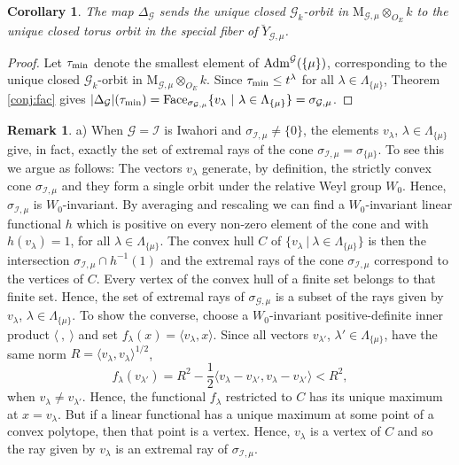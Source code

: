 \documentclass[reqno, 10pt]{amsart}
\newcommand{\CG}{\ensuremath{\mathcal {G}}\xspace}
\newcommand{\CI}{\ensuremath{\mathcal {I}}\xspace}
\newcommand{\RM}{\ensuremath{\mathrm {M}}\xspace}
\newtheorem{corollary}[subsubsection]{Corollary}
\theoremstyle{definition}
\newtheorem{remark}[subsubsection]{Remark}
\numberwithin{equation}{subsection}
\numberwithin{subsubsection}{subsection}
\newcommand{\br}{\breve}
\begin{document}
\begin{corollary}\label{cor:oldC}
The map $\Delta_\CG$ sends the unique closed $\CG_k$-orbit in $\RM_{\CG,\mu}\otimes_{O_E}k$ to the unique closed torus orbit in the special fiber of $\br Y_{\CG,\mu}$.
\end{corollary}
\begin{proof}
Let $\tau_{\rm min}$ denote the smallest element of ${\rm Adm}^\CG(\{\mu\})$, corresponding to the unique closed $\CG_k$-orbit in $\RM_{\CG,\mu}\otimes_{O_E}k$. Since $\tau_{\rm min}\leq t^\lambda$ for all $\lambda\in\Lambda_{\{\mu\}}$, Theorem \ref{conj:fac} gives 
$|\Delta_\CG|(\tau_{\rm min})={\rm Face}_{\sigma_{\CG,\mu}}\{v_\lambda\ |\ \lambda\in\Lambda_{\{\mu\}}\}=\sigma_{\CG,\mu}$.
\end{proof}
 
\begin{remark}\label{rem:oldBandC}
a) When $\CG=\CI$ is Iwahori and $\sigma_{\CI,\mu}\neq \{0\}$, the  elements $v_\lambda$, $\lambda\in \Lambda_{\{\mu\}}$  give, in fact, exactly the set of extremal rays of the cone $\sigma_{\CI,\mu}=\sigma_{\{\mu\}}$.  To see this we  argue as follows: The vectors $v_\lambda$ generate, by definition, the strictly convex cone $\sigma_{\CI, \mu}$ 
 and they form a single orbit under the relative Weyl group $W_0$. Hence, $\sigma_{\CI, \mu}$ is $W_0$-invariant. 
 By averaging and rescaling we can find a  $W_0$-invariant linear functional $h$ which is positive on every non-zero element of the cone and with $h(v_\lambda)=1$, for all $\lambda\in \Lambda_{\{\mu\}}$. The convex hull $C$ of $\{v_\lambda\ |\ \lambda\in \Lambda_{\{\mu\}}\}$  is then the intersection $\sigma_{\CI,\mu}\cap h^{-1}(1)$
 and the extremal rays of the cone $\sigma_{\CI,\mu}$ correspond to the vertices of $C$. Every vertex of  the convex hull of a finite set belongs to that finite set. Hence, the set of extremal rays of $\sigma_{\CG,\mu}$ is a subset of the rays given by $v_\lambda$, $\lambda\in \Lambda_{\{\mu\}}$. To show the converse,  choose a $W_0$-invariant positive-definite inner product $\langle\ ,\ \rangle$ and set 
 $f_\lambda(x)=\langle v_\lambda, x \rangle$. Since all vectors $v_{\lambda'}$, $\lambda'\in \Lambda_{\{\mu\}}$, have the same norm $R=\langle v_\lambda ,v_\lambda \rangle^{1/2}$, 
 \[
f_\lambda(v_{\lambda'})=R^2-\frac{1}{2}\langle v_\lambda- v_{\lambda'} , v_\lambda- v_{\lambda'} \rangle<R^2,
 \]
 when $v_\lambda\neq v_{\lambda'}$. Hence, the functional $f_\lambda$ restricted to $C$ has its unique maximum at $x=v_\lambda$. But if a linear functional has a unique maximum at some point of a convex polytope, then that point is a vertex. 
Hence, $v_\lambda$ is a vertex of $C$ and so the ray given by $v_\lambda$ is an extremal ray of $\sigma_{\CI,\mu}$.
  

\end{remark}
\end{document}
